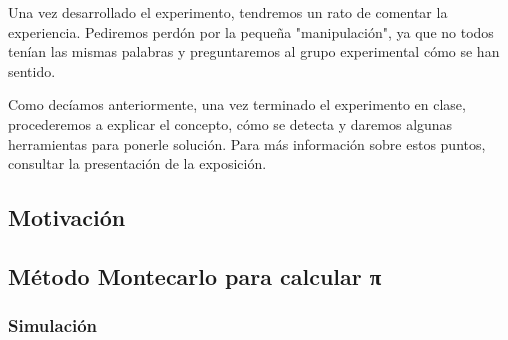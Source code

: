 Una vez desarrollado el experimento, tendremos un rato de comentar la experiencia. 
%
Pediremos perdón por la pequeña "manipulación", ya que no todos tenían las mismas palabras y preguntaremos al grupo experimental cómo se han sentido.

Como decíamos anteriormente, una vez terminado el experimento en clase, procederemos a explicar el concepto, cómo se detecta y daremos algunas herramientas para ponerle solución. 
%
Para más información sobre estos puntos, consultar la presentación de la exposición.

\subsection{Motivación}


\subsection{Método Montecarlo para calcular π}
\label{pimanual}

\subsubsection{Simulación}


